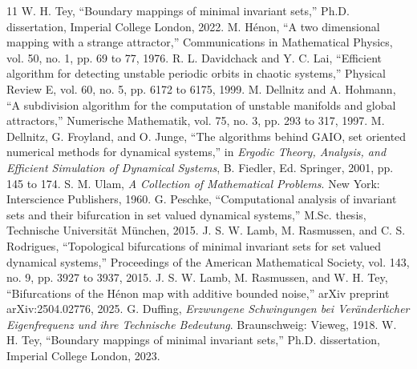 \documentclass[11pt,twocolumn]{article}
\begin{document}
\begin{thebibliography}{11}
 W. H. Tey, ``Boundary mappings of minimal invariant sets,'' Ph.D. dissertation, Imperial College London, 2022.
 M. H\'enon, ``A two dimensional mapping with a strange attractor,'' Communications in Mathematical Physics, vol. 50, no. 1, pp. 69 to 77, 1976.
 R. L. Davidchack and Y. C. Lai, ``Efficient algorithm for detecting unstable periodic orbits in chaotic systems,'' Physical Review E, vol. 60, no. 5, pp. 6172 to 6175, 1999.
 M. Dellnitz and A. Hohmann, ``A subdivision algorithm for the computation of unstable manifolds and global attractors,'' Numerische Mathematik, vol. 75, no. 3, pp. 293 to 317, 1997.
 M. Dellnitz, G. Froyland, and O. Junge, ``The algorithms behind GAIO, set oriented numerical methods for dynamical systems,'' in \textit{Ergodic Theory, Analysis, and Efficient Simulation of Dynamical Systems}, B. Fiedler, Ed. Springer, 2001, pp. 145 to 174.
 S. M. Ulam, \textit{A Collection of Mathematical Problems}. New York: Interscience Publishers, 1960.
 G. Peschke, ``Computational analysis of invariant sets and their bifurcation in set valued dynamical systems,'' M.Sc. thesis, Technische Universit\"at M\"unchen, 2015.
 J. S. W. Lamb, M. Rasmussen, and C. S. Rodrigues, ``Topological bifurcations of minimal invariant sets for set valued dynamical systems,'' Proceedings of the American Mathematical Society, vol. 143, no. 9, pp. 3927 to 3937, 2015.
 J. S. W. Lamb, M. Rasmussen, and W. H. Tey, ``Bifurcations of the H\'enon map with additive bounded noise,'' arXiv preprint arXiv:2504.02776, 2025.
 G. Duffing, \textit{Erzwungene Schwingungen bei Ver\"anderlicher Eigenfrequenz und ihre Technische Bedeutung}. Braunschweig: Vieweg, 1918.
 W. H. Tey, ``Boundary mappings of minimal invariant sets,'' Ph.D. dissertation, Imperial College London, 2023.

\end{thebibliography}
\end{document}

